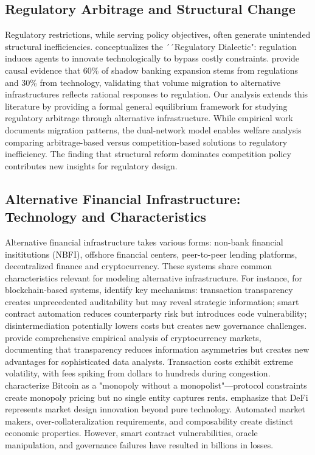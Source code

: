 \documentclass[12pt]{article}
\begin{document}
\subsection{Regulatory Arbitrage and Structural Change}

Regulatory restrictions, while serving policy objectives, often generate unintended structural inefficiencies. \citet{kane_good_1977} conceptualizes the ´´Regulatory Dialectic": regulation induces agents to innovate technologically to bypass costly constraints. \citet{buchak_fintech_2018} provide causal evidence that 60\% of shadow banking expansion stems from regulations and 30\% from technology, validating that volume migration to alternative infrastructures reflects rational responses to regulation. Our analysis extends this literature by providing a formal general equilibrium framework for studying regulatory arbitrage through alternative infrastructure. While empirical work documents migration patterns, the dual-network model enables welfare analysis comparing arbitrage-based versus competition-based solutions to regulatory inefficiency. The finding that structural reform dominates competition policy contributes new insights for regulatory design.

\subsection{Alternative Financial Infrastructure: Technology and Characteristics}

Alternative financial infrastructure takes various forms: non-bank financial insititutions (NBFI), offshore financial centers, peer-to-peer lending platforms, decentralized finance and cryptocurrency. These systems share common characteristics relevant for modeling alternative infrastructure. For instance, for blockchain-based systems, \citet{cong_blockchain_2019} identify key mechanisms: transaction transparency creates unprecedented auditability but may reveal strategic information; smart contract automation reduces counterparty risk but introduces code vulnerability; disintermediation potentially lowers costs but creates new governance challenges. \citet{makarov_blockchain_2021} provide comprehensive empirical analysis of cryptocurrency markets, documenting that transparency reduces information asymmetries but creates new advantages for sophisticated data analysts. Transaction costs exhibit extreme volatility, with fees spiking from dollars to hundreds during congestion. \citet{huberman_monopoly_2021} characterize Bitcoin as a "monopoly without a monopolist"—protocol constraints create monopoly pricing but no single entity captures rents. \citet{harvey_defi_2021} emphasize that DeFi represents market design innovation beyond pure technology. Automated market makers, over-collateralization requirements, and composability create distinct economic properties. However, smart contract vulnerabilities, oracle manipulation, and governance failures have resulted in billions in losses.
\end{document}

